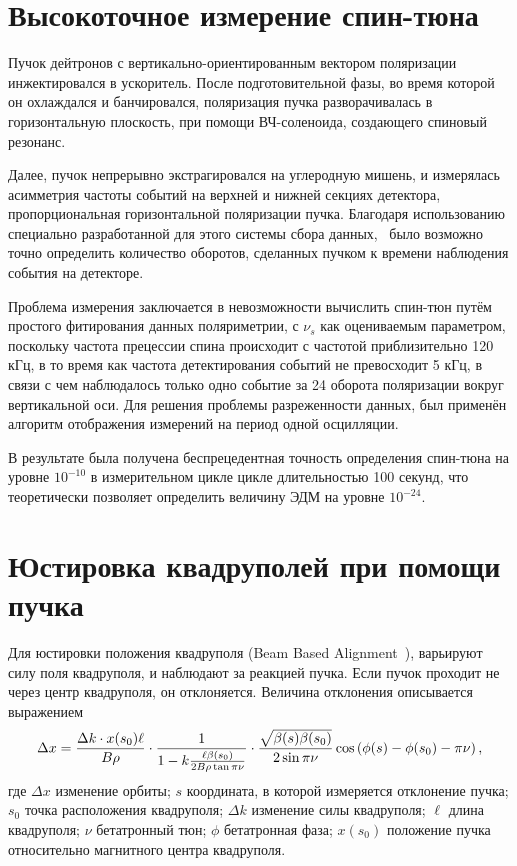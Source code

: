 

\section{Высокоточное измерение спин-тюна}
Пучок дейтронов с вертикально-ориентированным вектором поляризации инжектировался в ускоритель. После подготовительной фазы, во время которой он охлаждался и банчировался, поляризация пучка разворачивалась в горизонтальную плоскость, при помощи ВЧ-соленоида, создающего спиновый резонанс.~\cite[p.~7]{COSY:SpinTuneMapping}

Далее, пучок непрерывно экстрагировался на углеродную мишень, и измерялась асимметрия частоты событий на верхней и нижней секциях детектора, пропорциональная горизонтальной поляризации пучка. Благодаря использованию специально разработанной для этого системы сбора данных,~\cite{COSY:DAQ} было возможно точно определить количество оборотов, сделанных пучком к времени наблюдения события на детекторе.

Проблема измерения заключается в невозможности вычислить спин-тюн путём простого фитирования данных поляриметрии, с $\nu_s$ как оцениваемым параметром, поскольку частота прецессии спина происходит с частотой приблизительно 120 кГц, в то время как частота детектирования событий не превосходит 5 кГц, в связи с чем наблюдалось только одно событие за 24 оборота поляризации вокруг вертикальной оси. Для решения проблемы разреженности данных, был применён алгоритм отображения измерений на период одной осцилляции.~\cite{Eversmann:SpinTuneMeasurement}

В результате была получена беспрецедентная точность определения спин-тюна на уровне $10^{-10}$ в измерительном цикле цикле длительностью 100 секунд, что теоретически позволяет определить величину ЭДМ на уровне $10^{-24}$\ecm.

\section{Юстировка квадруполей при помощи пучка}
\newcommand{\Nbpm}{N_{\mathrm{BPM}}}
Для юстировки положения квадруполя (Beam Based Alignment~\cite{Wagner:BBA2018}), варьируют силу поля квадруполя, и наблюдают за реакцией пучка. Если пучок проходит не через центр квадруполя, он отклоняется. Величина отклонения описывается выражением
\[
\Delta x = \frac{\Delta k\cdot x(s_0)\ell}{B\rho}\cdot \frac{1}{1 - k\frac{\ell\beta(s_0)}{2B\rho\tan\pi\nu}}\cdot \frac{\sqrt{\beta(s)\beta(s_0)}}{2\sin\pi\nu}\cos\bkt{\phi(s) - \phi(s_0) - \pi\nu},
\]
где $\Delta x$ изменение орбиты; $s$ координата, в которой измеряется отклонение пучка; $s_0$ точка расположения квадруполя; $\Delta k$ изменение силы квадруполя; $\ell$ длина квадруполя; $\nu$ бетатронный тюн; $\phi$ бетатронная фаза; $x(s_0)$ положение пучка относительно магнитного центра квадруполя.

